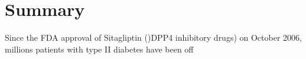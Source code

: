 \section{\label{chap:Sum} Summary}
Since the FDA approval of Sitagliptin ()DPP4 inhibitory drugs) on October 2006, millions patients with type II diabetes have been off
